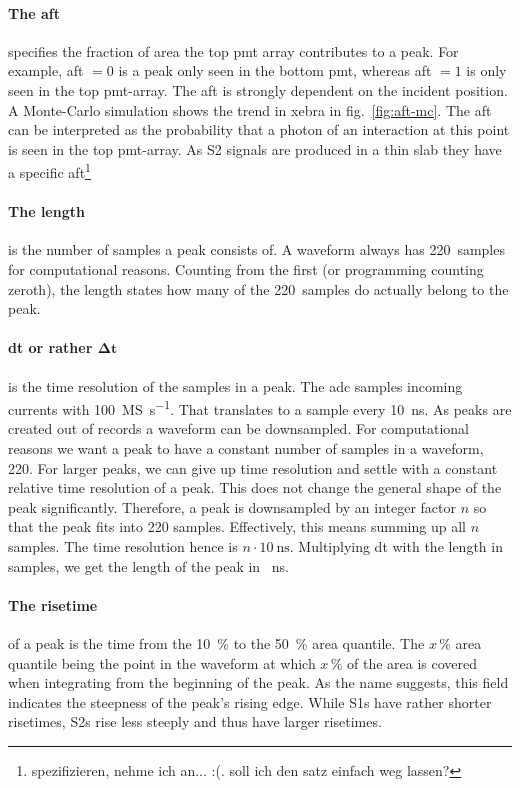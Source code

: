 \paragraph{The \gls{aft}} specifies the fraction of area the top \gls{pmt} array contributes to a peak.
For example, \gls{aft} $ = 0 $ is a peak only seen in the bottom \gls{pmt}, whereas \gls{aft} $ = 1 $ is only seen in the top \gls{pmt}-array.
The \gls{aft} is strongly dependent on the incident position.
A Monte-Carlo simulation shows the trend in \gls{xebra} in fig.~\ref{fig:aft-mc}. %
The \gls{aft} can be interpreted as the probability that a photon of an interaction at this point is seen in the top \gls{pmt}-array.
As S2 signals are produced in a thin slab they have a specific \gls{aft}\footnote{spezifizieren, nehme ich an... :(. soll ich den satz einfach weg lassen?}

\paragraph{The length} is the number of samples a peak consists of.
A waveform always has \SI{220}{samples} for computational reasons.
Counting from the first (or programming counting zeroth), the length states how many of the \SI{220}{samples} do actually belong to the peak.

\paragraph{dt or rather $ \mathbf{\Delta t}$} is the time resolution of the samples in a peak.
The \gls{adc} samples incoming currents with \SI{100}{\mega S\per\second}.
That translates to a sample every \SI{10}{\nano\second}.
As peaks are created out of records a waveform can be downsampled.
For computational reasons we want a peak to have a constant number of samples in a waveform, 220.
For larger peaks, we can give up time resolution and settle with a constant relative time resolution of a peak.
This does not change the general shape of the peak significantly.
Therefore, a peak is downsampled by an integer factor $ n $ so that the peak fits into 220 samples.
Effectively, this means summing up all $ n $ samples.
The time resolution hence is $ n \cdot \SI{10}{\nano\second} $.
Multiplying dt with the length in samples, we get the length of the peak in \SI{}{\nano\second}.

\paragraph{The risetime} of a peak is the time from the \SI{10}{\%} to the \SI{50}{\%} area quantile.
The $ x\,\% $ area quantile being the point in the waveform at which $ x\,\% $ of the area is covered when integrating from the beginning of the peak.
As the name suggests, this field indicates the steepness of the peak's rising edge.
While S1s have rather shorter risetimes, S2s rise less steeply and thus have larger risetimes.

